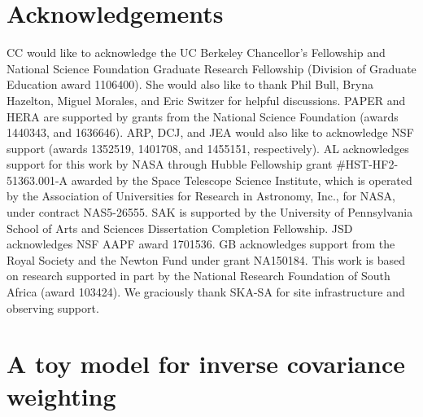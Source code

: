 \documentclass[preprint2,numberedappendix,tighten]{aastex6}  %
\begin{document}
\section{Acknowledgements}
CC would like to acknowledge the UC Berkeley Chancellor's Fellowship and National Science Foundation Graduate Research 
Fellowship (Division of Graduate Education award 1106400). She would also like to thank Phil Bull, Bryna Hazelton, Miguel Morales, and Eric Switzer for helpful discussions. PAPER and HERA 
are supported by grants from the National Science Foundation (awards 1440343, and 1636646). ARP, DCJ, and JEA would 
also like to acknowledge NSF support (awards 1352519, 1401708, and 1455151, respectively). AL acknowledges support for this work by NASA through Hubble Fellowship grant \#HST-HF2-51363.001-A awarded by the Space Telescope Science Institute, which is operated by the Association of Universities for Research in Astronomy, Inc., for NASA, under contract NAS5-26555. SAK is supported by the University of Pennsylvania School of Arts and Sciences Dissertation Completion Fellowship. JSD acknowledges NSF AAPF
award 1701536. GB acknowledges support from the Royal Society and the Newton Fund under grant NA150184. This work is based on research supported in part by the National Research Foundation of South Africa (award 103424). We graciously thank SKA-SA for site infrastructure and observing support.
\label{sec:Ack}



\appendix
\section{A toy model for inverse covariance weighting}
\label{sec:icw_appendix}

\end{document}
